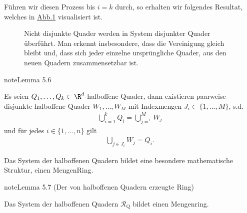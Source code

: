 \documentclass[letterpaper,10pt,german]{jupyterBook}
\let\sphinxpxdimen\pdfpxdimen\else\newdimen\sphinxpxdimen
\begin{document}
\sphinxAtStartPar
Führen wir diesen Prozess bis \(i=k\) durch, so erhalten wir folgendes Resultat, welches in \hyperref[\detokenize{masstheorie/masstheorie:fig-disrect}]{Abb.\@ \ref{\detokenize{masstheorie/masstheorie:fig-disrect}}} visualisiert ist.

\begin{figure}[htbp]
\centering
\capstart

\noindent\sphinxincludegraphics[width=400\sphinxpxdimen]{{DisRect}.jpg}
\caption{Nicht disjunkte Quader werden in System disjunkter Quader überführt. Man erkennt insbesondere, dass die Vereinigung gleich bleibt und, dass sich jeder einzelne ursprüngliche Quader, aus den neuen Quadern zusammensetzbar ist.}\label{\detokenize{masstheorie/masstheorie:fig-disrect}}\end{figure}
\label{masstheorie/masstheorie:lem:disRect}
\begin{sphinxadmonition}{note}{Lemma 5.6}



\sphinxAtStartPar
Es seien \(Q_1,\ldots,Q_k\subset\R^d\) halboffene Quader, dann existieren paarweise disjunkte halboffene Quader \(W_1,\ldots, W_M\) mit Indexmengen \(J_i\subset\{1,\ldots,M\}\), s.d.
\begin{equation*}
\begin{split}\bigcup_{i=1}^k Q_i = \bigcup_{j=^1}^M W_j\end{split}
\end{equation*}
\sphinxAtStartPar
und für jedes \(i\in\{1,\ldots,n\}\) gilt
\begin{equation*}
\begin{split}\bigcup_{j\in J_i} W_j = Q_i.\end{split}
\end{equation*}\end{sphinxadmonition}

\sphinxAtStartPar
Das System der halboffenen Quadern bildet eine besondere mathematische Struktur, einen Mengen\sphinxhyphen{}Ring.
\label{masstheorie/masstheorie:lemma-23}
\begin{sphinxadmonition}{note}{Lemma 5.7 (Der von halboffenen Quadern erzeugte Ring)}



\sphinxAtStartPar
Das System der halboffenen Quadern \(\mathcal{R}_{\text{Q}}\) bildet einen Mengenring.
\end{sphinxadmonition}
\end{document}
